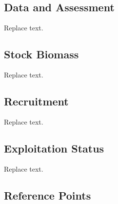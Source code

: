 \documentclass[11pt,
  english,
  a4paper,
]{article}
\begin{document}
\hypertarget{data-and-assessment}{%
\subsection*{Data and Assessment}\label{data-and-assessment}}

\leavevmode\tagmcend\tagstructend

Replace text.


\hypertarget{stock-biomass}{%
\subsection*{Stock Biomass}\label{stock-biomass}}

\leavevmode\tagmcend\tagstructend

Replace text.


\hypertarget{recruitment}{%
\subsection*{Recruitment}\label{recruitment}}

\leavevmode\tagmcend\tagstructend

Replace text.


\hypertarget{exploitation-status}{%
\subsection*{Exploitation Status}\label{exploitation-status}}

\leavevmode\tagmcend\tagstructend

Replace text.


\hypertarget{reference-points}{%
\subsection*{Reference Points}\label{reference-points}}

\leavevmode\tagmcend\tagstructend
\end{document}
